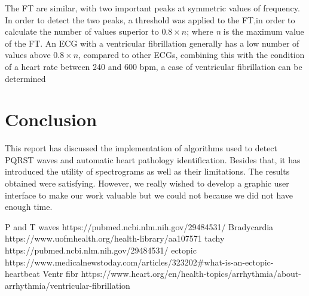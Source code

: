 \documentclass{article}
\begin{document}
\newpage

The FT are similar, with two important peaks at symmetric values of frequency. In order to detect the two peaks,  a threshold was applied to the FT,in order to calculate the number of values superior to $0.8\times\textit{n}$; where \textit{n} is the maximum value of the FT. An ECG with a ventricular fibrillation generally has a low number of values above  $0.8\times\textit{n}$, compared to other ECGs, combining this with the condition of a heart rate between 240 and 600 bpm, a case of ventricular fibrillation can be determined




\section{Conclusion}
This report has discussed the implementation of algorithms used to detect PQRST waves and automatic heart pathology identification. Besides that, it has introduced the utility of spectrograms as well as their limitations. The results obtained were satisfying. However, we really wished to develop a graphic user interface to make our work valuable but we could not because we did not have enough time.

\newpgae

\begin{thebibliography}{2} 
    P and T waves https://pubmed.ncbi.nlm.nih.gov/29484531/
    Bradycardia   https://www.uofmhealth.org/health-library/aa107571
    tachy https://pubmed.ncbi.nlm.nih.gov/29484531/
    ectopic https://www.medicalnewstoday.com/articles/323202#what-is-an-ectopic-heartbeat
    Ventr fibr https://www.heart.org/en/health-topics/arrhythmia/about-arrhythmia/ventricular-fibrillation
   
\end{thebibliography} 
\end{document}
